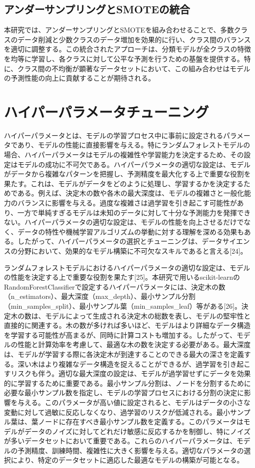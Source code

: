 \documentclass[platex]{suribt}
\begin{document}
\subsection{アンダーサンプリングとSMOTEの統合}
本研究では、アンダーサンプリングとSMOTEを組み合わせることで、多数クラスのデータ削減と少数クラスのデータ増加を効果的に行い、クラス間のバランスを適切に調整する。この統合されたアプローチは、分類モデルが全クラスの特徴を均等に学習し、各クラスに対して公平な予測を行うための基盤を提供する。特に、クラス間の不均衡が顕著なデータセットにおいて、この組み合わせはモデルの予測性能の向上に貢献することが期待される。
\section{ハイパーパラメータチューニング}
ハイパーパラメータとは、モデルの学習プロセス中に事前に設定されるパラメータであり、モデルの性能に直接影響を与える。特にランダムフォレストモデルの場合、ハイパーパラメータはモデルの複雑性や学習能力を決定するため、その設定はモデルの成功に不可欠である。ハイパーパラメータの適切な設定は、モデルがデータから複雑なパターンを把握し、予測精度を最大化する上で重要な役割を果たす。これは、モデルがデータをどのように処理し、学習するかを決定するためである。例えば、決定木の数や各木の最大深度は、モデルの複雑さと一般化能力のバランスに影響を与える。過度な複雑さは過学習を引き起こす可能性があり、一方で単純すぎるモデルは未知のデータに対して十分な予測能力を発揮できない。ハイパーパラメータの適切な設定は、モデルの性能を向上させるだけでなく、データの特性や機械学習アルゴリズムの挙動に対する理解を深める効果もある。したがって、ハイパーパラメータの選択とチューニングは、データサイエンスの分野において、効果的なモデル構築に不可欠なスキルであると言える[24]。

ランダムフォレストモデルにおけるハイパーパラメータの適切な設定は、モデルの性能を決定する上で重要な役割を果たす[25]。本研究で用いるscikit-learnのRandomForestClassifierで設定するハイパーパラメータには、決定木の数（n\_estimators）、最大深度（max\_depth）、最小サンプル分割（min\_samples\_split）、最小サンプル葉（min\_samples\_leaf）等がある[26]。決定木の数は、モデルによって生成される決定木の総数を表し、モデルの堅牢性と直接的に関連する。木の数が多ければ多いほど、モデルはより詳細なデータ構造を学習する可能性が高まるが、同時に計算コストも増加する。したがって、モデルの性能と計算効率を考慮して、最適な木の数を決定する必要がある。最大深度は、モデルが学習する際に各決定木が到達することのできる最大の深さを定義する。深い木はより複雑なデータ構造を捉えることができるが、過学習を引き起こすリスクも伴う。適切な最大深度の設定は、モデルが過学習せずにデータを効果的に学習するために重要である。最小サンプル分割は、ノードを分割するために必要な最小サンプル数を指定し、モデルの学習プロセスにおける分割の決定に影響を与える。このパラメータが高い値に設定されると、モデルはデータの小さな変動に対して過敏に反応しなくなり、過学習のリスクが低減される。最小サンプル葉は、葉ノードに存在すべき最小サンプル数を定義する。このパラメータはモデルがデータのノイズに対してどれだけ敏感に反応するかを制御し、特にノイズが多いデータセットにおいて重要である。これらのハイパーパラメータは、モデルの予測精度、訓練時間、複雑性に大きく影響を与える。適切なパラメータの選択により、特定のデータセットに適応した最適なモデルの構築が可能となる。
\end{document}

